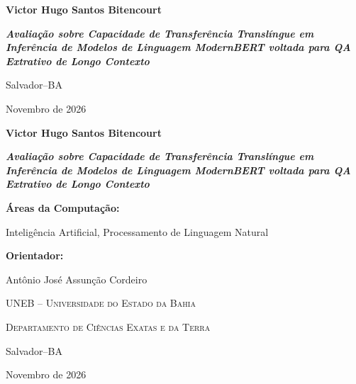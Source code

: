 \documentclass[12pt,a4paper]{article}
\begin{document}
\pagestyle{empty}
\hypersetup{pageanchor=false}

\begin{titlepage}
    \centering
    {\large \textbf{Victor Hugo Santos Bitencourt}\par}
    
    \vfill
    {\LARGE \textbf{\textit{Avaliação sobre Capacidade de Transferência Translíngue em Inferência de Modelos de Linguagem ModernBERT voltada para QA Extrativo de Longo Contexto}}\par}
    
    \vfill
    {\large Salvador--BA\par}
    {\large Novembro de 2026\par}
\end{titlepage}

\begin{titlepage}
    \centering
    {\large \textbf{Victor Hugo Santos Bitencourt}\par}
    
    \vfill
    {\LARGE \textbf{\textit{Avaliação sobre Capacidade de Transferência Translíngue em Inferência de Modelos de Linguagem ModernBERT voltada para QA Extrativo de Longo Contexto}}\par}
    
    \vspace{2cm}
    \hfill
    \begin{minipage}{0.65\textwidth}
        \raggedright
        \textbf{Áreas da Computação:}\par
        Inteligência Artificial, Processamento de Linguagem Natural\par
        \vspace{0.8cm}
        \textbf{Orientador:}\par
        \mbox{}Antônio José Assunção Cordeiro
    \end{minipage}
    
    \vfill
    {\large \textsc{UNEB -- Universidade do Estado da Bahia}\par}
    {\large \textsc{Departamento de Ciências Exatas e da Terra}\par}
    \vspace{0.5cm}
    {\large Salvador--BA\par}
    {\large Novembro de 2026\par}
\end{titlepage}
\end{document}
